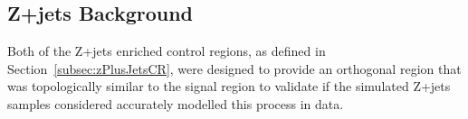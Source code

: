 

\subsection{Z+jets Background}\label{subsec:zPlusJetsEstimation}
Both of the Z+jets enriched control regions, as defined in Section~\ref{subsec:zPlusJetsCR}, were designed to provide an orthogonal region that was topologically similar to the signal region to validate if the simulated Z+jets samples considered accurately modelled this process in data.

